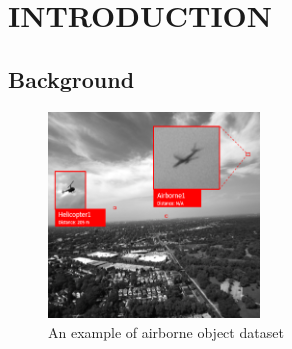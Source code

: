 \chapter{INTRODUCTION}
\section{Background}
\label{section:background}
    \begin{figure} [H]
        \centering
        \includegraphics[width=0.5\textwidth]{figures/dataset-example-labeled.png}
        \caption{An example of airborne object dataset}
        \label{fig:airborne-object-example-1}
    \end{figure}
    \vspace{-2ex}


